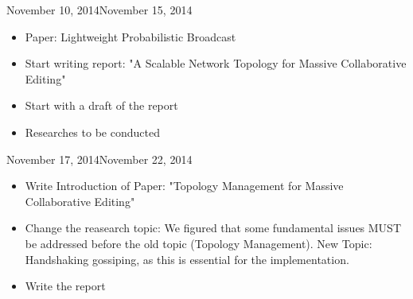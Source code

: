 \documentclass[11pt, english, screen]{report-rd-info}
\begin{document}
\begin{fichesuivi}{November 10, 2014}{November 15, 2014}

   \begin{travaileffectue}
      \begin{itemize}
        \item {Paper: Lightweight Probabilistic Broadcast}
        \item {Start writing report: "A Scalable Network Topology for Massive Collaborative Editing"}
    \end{itemize}
   \end{travaileffectue}

   \begin{travailnoneffectue}
   \end{travailnoneffectue}

   \begin{echange}
   \end{echange}

   \begin{planification}
      \begin{itemize}
         \item Start with a draft of the report
         \item Researches to be conducted
      \end{itemize}
   \end{planification}
\end{fichesuivi}

\begin{fichesuivi}{November 17, 2014}{November 22, 2014}

   \begin{travaileffectue}
      \begin{itemize}
   \item {Write Introduction of Paper: "Topology Management for Massive Collaborative Editing"}
      \end{itemize}
   \end{travaileffectue}

      \begin{itemize}
          \item {Change the reasearch topic: We figured that some fundamental issues MUST be addressed before the old topic (Topology Management). New Topic: Handshaking gossiping, as this is essential for the implementation.}
      \end{itemize}
   \begin{travailnoneffectue}
   \end{travailnoneffectue}

   \begin{echange}
   \end{echange}

   \begin{planification}
      \begin{itemize}
         \item Write the report
      \end{itemize}
   \end{planification}
\end{fichesuivi}
\end{document}
